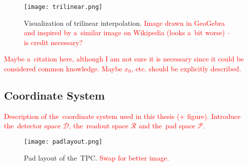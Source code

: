 					\begin{figure}
						\centering
						\texttt{[image: trilinear.png]}
						\label{fig:trilin}
						\caption{Visualization of trilinear interpolation. \textcolor{red}{Image drawn in GeoGebra and inspired by a~similar image on Wikipedia (looks a~bit worse) -- is credit necessary?}}
					\end{figure}
				
				\textcolor{red}{Maybe a~citation here, although I am not sure it is necessary since it could be considered common knowledge. Maybe $x_0$, etc. should be explicitly described.}
		
		\subsection{Coordinate System}
		\label{sec:coor}
		\textcolor{red}{Description of the~coordinate system used in this thesis (+ figure). Introduce the~detector space $\mathcal{D}$, the~readout space $\mathcal{R}$ and the~pad space $\mathcal{P}$.}
	
	\begin{figure}
		\centering
		\texttt{[image: padlayout.png]}
		\caption{Pad layout of the~TPC. \textcolor{red}{Swap for better image.}}
		\label{fig:padlayout}
	\end{figure}
